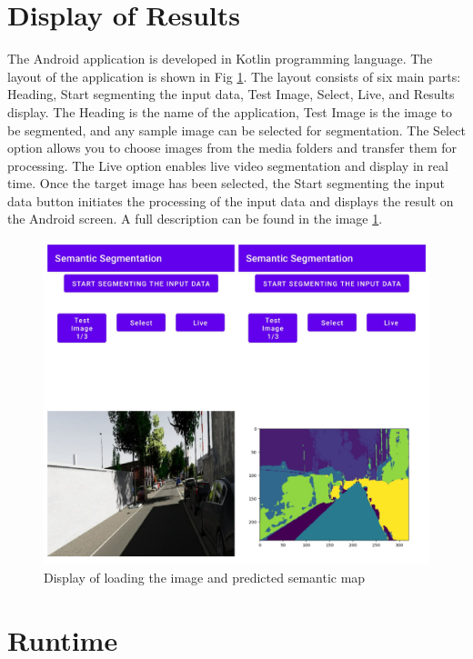    \section{Display of Results}
	
	The Android application is developed in Kotlin programming language. The layout of the application is shown in Fig \ref{fig:android_result}. The layout consists of six main parts: Heading, Start segmenting the input data, Test Image, Select, Live, and Results display. The Heading is the name of the application, Test Image is the image to be segmented, and any sample image can be selected for segmentation. The Select option allows you to choose images from the media folders and transfer them for processing. The Live option enables live video segmentation and display in real time. Once the target image has been selected, the Start segmenting the input data button initiates the processing of the input data and displays the result on the Android screen. A full description can be found in the image \ref{fig:android_result}. 
	
	\begin{figure}
		\centering
		\includegraphics[width=13cm]{images/android_ss.jpg}
		\caption{Display of loading the image and predicted semantic map}
		\label{fig:android_result}
	\end{figure}
    
    \newpage
    \section{Runtime}
	
